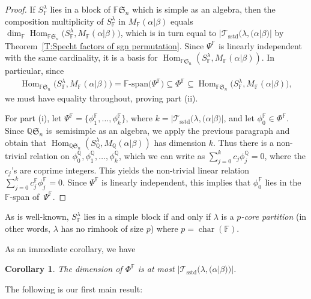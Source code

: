 \documentclass[pdftex]{sigma}
\newtheorem{Corollary}[Theorem]{Corollary}
\newcommand{\TTS}{\mathscr{T}_\mathrm{sstd}}
\newcommand{\Char}{\operatorname{\mathrm{char}}}
\newcommand{\Hom}{\operatorname{Hom}}
\newcommand{\sym}[1]{\mathfrak{S}_{#1}}
\newcommand{\F}{\mathbb{F}}
\begin{document}
\begin{proof}
	If $S_\F^{\lambda}$ lies in a block of $\F\sym{n}$ which is simple as an algebra, then the composition multiplicity of $S_\F^{\lambda}$ in $M_\F(\alpha|\beta)$ equals $\dim_{\F} \Hom _{\F \sym{n}}\big(S_\F^{\lambda}, M_\F(\alpha|\beta)\big)$, which is in turn equal to $|\TTS(\lambda, (\alpha|\beta)|$ by Theorem~\ref{T:Specht factors of sgn permutation}. Since $\Psi^{\F}$ is linearly independent with the same cardinality, it is a basis for $\Hom _{\F \sym{n}}(S_\F^{\lambda}, M_\F(\alpha|\beta))$. In particular, since \begin{gather*}\Hom _{\F \sym{n}}\big(S_\F^{\lambda}, M_\F(\alpha|\beta)\big) = \F\text{-span}\big(\Psi^{\F}\big) \subseteq \Phi^{\F} \subseteq \Hom _{\F \sym{n}}\big(S_\F^{\lambda}, M_\F(\alpha|\beta)\big),\end{gather*} we must have equality throughout, proving part (ii).
	
	For part (i), let $\Psi^{\F} = \big\{ \phi_1^{\F}, \dotsc, \phi_k^{\F} \big\}$, where $k = |\TTS(\lambda, (\alpha|\beta)|$, and let $\phi_0^{\F} \in \Phi^{\F}$. Since $\mathbb{Q}\sym{n}$ is~semisimple as an algebra, we apply the previous paragraph and obtain that \linebreak $\Hom_{\mathbb{Q}\sym{n}}(S_{\mathbb{Q}}^{\lambda}, M_{\mathbb{Q}}(\alpha|\beta))$ has dimension $k$. Thus there is a non-trivial relation on $\phi_0^{\mathbb{Q}}, \phi_{1}^{\mathbb{Q}}, \dotsc, \phi_{k}^{\mathbb{Q}}$, which we can write as $\sum\limits_{j =0}^k c_j \phi_{j}^{\mathbb{Q}} = 0$, where the $c_j$'s are coprime integers. This yields the non-trivial linear relation $\sum\limits_{j =0}^k c_j^{\F} \phi_{j}^{\F} = 0$. Since $\Psi^{\F}$ is linearly independent, this implies that $\phi_{0}^{\F}$ lies in the $\F$-span of~$\Psi^{\F}$.
\end{proof}

\begin{Remark}
As is well-known, $S^{\lambda}_{\F}$ lies in a simple block if and only if $\lambda$ is a {\em $p$-core partition} (in other words, $\lambda$ has no rimhook of size $p$) where $p=\Char(\F)$.
\end{Remark}

As an immediate corollary, we have

\begin{Corollary}The dimension of $\Phi^{\F}$ is at most $|\TTS(\lambda,(\alpha|\beta))|$.
\end{Corollary}

The following is our first main result:
\end{document}

